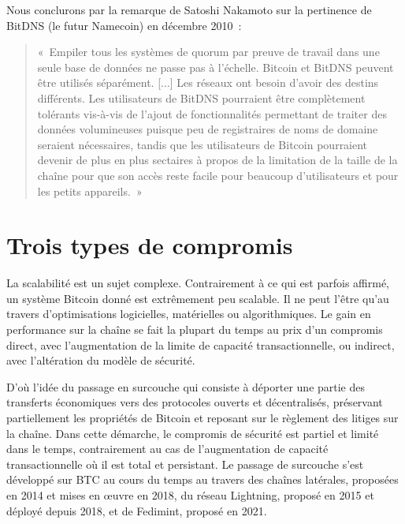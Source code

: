 Nous conclurons par la remarque de Satoshi Nakamoto sur la pertinence de BitDNS (le futur Namecoin) en décembre 2010~:

\begin{quote}
«~Empiler tous les systèmes de quorum par preuve de travail dans une seule base de données ne passe pas à l'échelle. Bitcoin et BitDNS peuvent être utilisés séparément. [...] Les réseaux ont besoin d'avoir des destins différents. Les utilisateurs de BitDNS pourraient être complètement tolérants vis-à-vis de l'ajout de fonctionnalités permettant de traiter des données volumineuses puisque peu de registraires de noms de domaine seraient nécessaires, tandis que les utilisateurs de Bitcoin pourraient devenir de plus en plus sectaires à propos de la limitation de la taille de la chaîne pour que son accès reste facile pour beaucoup d'utilisateurs et pour les petits appareils.~»
\end{quote}

\section*{Trois types de compromis}

La scalabilité est un sujet complexe. Contrairement à ce qui est parfois affirmé, un système Bitcoin donné est extrêmement peu scalable. Il ne peut l'être qu'au travers d'optimisations logicielles, matérielles ou algorithmiques. Le gain en performance sur la chaîne se fait la plupart du temps au prix d'un compromis direct, avec l'augmentation de la limite de capacité transactionnelle, ou indirect, avec l'altération du modèle de sécurité.

D'où l'idée du passage en surcouche qui consiste à déporter une partie des transferts économiques vers des protocoles ouverts et décentralisés, préservant partiellement les propriétés de Bitcoin et reposant sur le règlement des litiges sur la chaîne. Dans cette démarche, le compromis de sécurité est partiel et limité dans le temps, contrairement au cas de l'augmentation de capacité transactionnelle où il est total et persistant. Le passage de surcouche s'est développé sur BTC au cours du temps au travers des chaînes latérales, proposées en 2014 et mises en œuvre en 2018, du réseau Lightning, proposé en 2015 et déployé depuis 2018, et de Fedimint, proposé en 2021.

